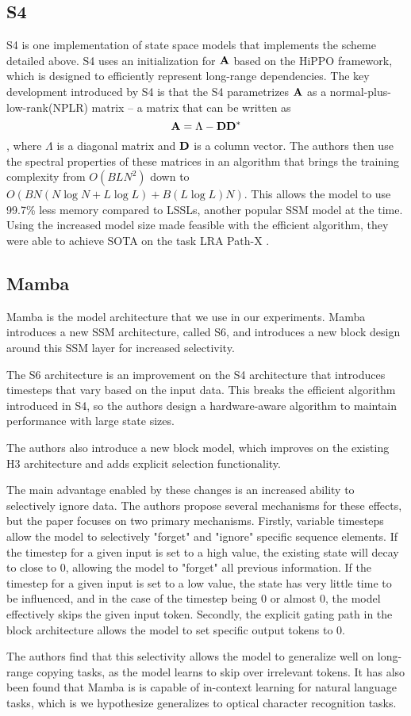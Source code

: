 \subsection{S4}
\label{section:background:s4}
S4\cite{s4} is one implementation of state space models that implements the
scheme detailed above.
S4 uses an initialization for ${\mathbf{A}}$ based on the HiPPO framework, which is
designed to efficiently represent long-range dependencies.
The key development introduced by S4 is that the S4 parametrizes ${\mathbf{A}}$ as a
normal-plus-low-rank(NPLR) matrix -- a matrix that can be written as
$$
{\mathbf{A}} = \Lambda - {\mathbf{D}}{\mathbf{D}}^*
$$
, where $\Lambda$ is a diagonal matrix and ${\mathbf{D}}$ is a column vector. The authors
then use the spectral properties of these matrices in an algorithm that brings
the training complexity from $O(BLN^2)$ down to
$O(BN(N \log N + L \log L) + B(L \log L)N)$\cite{s4}. This allows the model to
use 99.7\% less memory compared to LSSLs, another popular SSM model at the time.
Using the increased model size made feasible with the efficient algorithm, they
were able to achieve SOTA on the task LRA Path-X \cite{lra}.

\subsection{Mamba}
\label{section:background:mamba}
Mamba\cite{mamba} is the model architecture that we use in our experiments.
Mamba introduces a new SSM architecture, called S6, and introduces a new block
design around this SSM layer for increased selectivity.

The S6 architecture is an improvement on the S4 architecture that introduces
timesteps that vary based on the input data.
This breaks the efficient algorithm introduced in S4, so the authors design a
hardware-aware algorithm to maintain performance with large state sizes.

The authors also introduce a new block model, which improves on the
existing H3\cite{h3} architecture and adds explicit selection functionality.

The main advantage enabled by these changes is an increased ability to
selectively ignore data.
The authors propose several mechanisms for these effects, but the paper focuses
on two primary mechanisms.
Firstly, variable timesteps allow the model to selectively "forget" and "ignore"
specific sequence elements.
If the timestep for a given input is set to a high value, the existing state
will decay to close to 0, allowing the model to "forget" all previous
information. If the timestep for a given input is set to a low value, the state
has very little time to be influenced, and in the case of the timestep being 0
or almost 0, the model effectively skips the given input token.
Secondly, the explicit gating path in the block architecture allows the model to
set specific output tokens to 0.

The authors find that this selectivity allows the model to generalize well on
long-range copying tasks, as the model learns to skip over irrelevant tokens.
It has also been found that Mamba is is capable of in-context learning for
natural language tasks\cite{mambaicl}, which is we hypothesize generalizes to
optical character recognition tasks.
